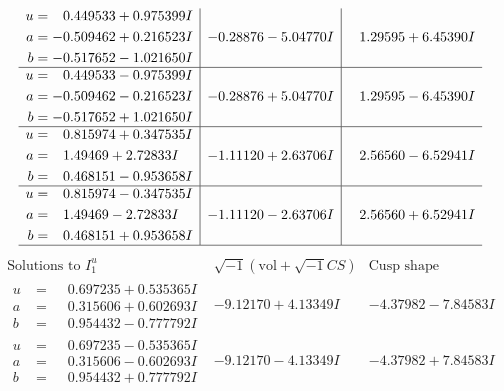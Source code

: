\documentclass[1p]{elsarticle_modified}
\theoremstyle{definition}
\newcommand{\I}{\sqrt{-1}}
\begin{document}
$$\begin{array}{c|c|c}
\begin{aligned}
u &= \phantom{-}0.449533 + 0.975399 I \\
a &= -0.509462 + 0.216523 I \\
b &= -0.517652 - 1.021650 I\end{aligned}
 & -0.28876 - 5.04770 I & \phantom{-}1.29595 + 6.45390 I \\ \hline\begin{aligned}
u &= \phantom{-}0.449533 - 0.975399 I \\
a &= -0.509462 - 0.216523 I \\
b &= -0.517652 + 1.021650 I\end{aligned}
 & -0.28876 + 5.04770 I & \phantom{-}1.29595 - 6.45390 I \\ \hline\begin{aligned}
u &= \phantom{-}0.815974 + 0.347535 I \\
a &= \phantom{-}1.49469 + 2.72833 I \\
b &= \phantom{-}0.468151 - 0.953658 I\end{aligned}
 & -1.11120 + 2.63706 I & \phantom{-}2.56560 - 6.52941 I \\ \hline\begin{aligned}
u &= \phantom{-}0.815974 - 0.347535 I \\
a &= \phantom{-}1.49469 - 2.72833 I \\
b &= \phantom{-}0.468151 + 0.953658 I\end{aligned}
 & -1.11120 - 2.63706 I & \phantom{-}2.56560 + 6.52941 I\\
 \hline 
 \end{array}$$\newpage$$\begin{array}{c|c|c}  
\text{Solutions to }I^u_{1}& \I (\text{vol} + \sqrt{-1}CS) & \text{Cusp shape}\\
 \hline 
\begin{aligned}
u &= \phantom{-}0.697235 + 0.535365 I \\
a &= \phantom{-}0.315606 + 0.602693 I \\
b &= \phantom{-}0.954432 - 0.777792 I\end{aligned}
 & -9.12170 + 4.13349 I & -4.37982 - 7.84583 I \\ \hline\begin{aligned}
u &= \phantom{-}0.697235 - 0.535365 I \\
a &= \phantom{-}0.315606 - 0.602693 I \\
b &= \phantom{-}0.954432 + 0.777792 I\end{aligned}
 & -9.12170 - 4.13349 I & -4.37982 + 7.84583 I \\ \hline\begin{aligned}

\end{aligned}
\end{array}$$
\end{document}
